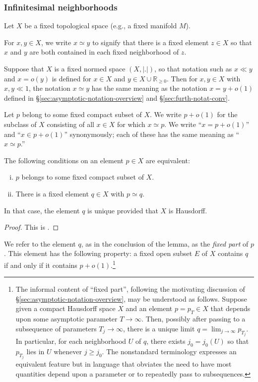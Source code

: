 \subsubsection{Infinitesimal neighborhoods}
Let $X$ be a fixed topological space (e.g., a fixed manifold $M$).
\begin{notation}
  For $x,y \in X$, we write $x \simeq y$ to signify that there is a fixed element $z \in X$ so that $x$ and $y$ are both contained in each fixed neighborhood of $z$.
\end{notation}
\begin{example}
  Suppose that $X$ is a fixed normed space $(X,|.|)$, so that notation such as $x \ll y$ and $x = o(y)$ is defined for $x \in X$ and $y \in X \cup \mathbb{R}_{\geq 0}$.  Then for $x,y \in X$ with $x,y \ll 1$, the notation $x \simeq y$ has the same meaning as the notation $x = y + o(1)$ defined in \S\ref{sec:asymptotic-notation-overview} and \S\ref{sec:furth-notat-conv}.
\end{example}

\begin{notation}
  Let $p$ belong to some fixed compact subset of $X$.  We write $p + o(1)$ for the subclass of $X$ consisting of all $x \in X$ for which $x \simeq p$.  We write ``$x = p + o(1)$'' and ``$x \in p + o(1)$'' synonymously; each of these has the same meaning as ``$x \simeq p$.''
\end{notation}

\begin{lemma}
  The following conditions on an element $p \in X$ are equivalent:
  \begin{enumerate}[(i)]
  \item $p$ belongs to some fixed compact subset of $X$.
  \item There is a fixed element $q \in X$ with $p \simeq q$.
  \end{enumerate}
  In that case, the element $q$ is unique provided that $X$ is Hausdorff.
\end{lemma}
\begin{proof}
  This is \cite[Thm 6.1]{MR469763}.
\end{proof}

We refer to the element $q$, as in the conclusion of the lemma, as the \emph{fixed part} of $p$.  This element has the following property: a fixed open subset $E$ of $X$ contains $q$ if and only if it contains $p + o(1)$.\footnote{ The informal content of ``fixed part'', following the motivating discussion of \S\ref{sec:asymptotic-notation-overview}, may be understood as follows.  Suppose given a compact Hausdorff space $X$ and an element $p = p_T \in X$ that depends upon some asymptotic parameter $T \rightarrow \infty$.  Then, possibly after passing to a subsequence of parameters $T_j \rightarrow \infty$, there is a unique limit $q = \lim_{j \rightarrow \infty} p_{T_j}$.
  In particular, for each neighborhood $U$ of $q$, there exists $j_0 = j_0(U)$ so that $p_{T_{j}}$ lies in $U$ whenever $j \geq j_0$.  The nonstandard terminology expresses an equivalent feature but in language that obviates the need to have most quantities depend upon a parameter or to repeatedly pass to subsequences.
}


